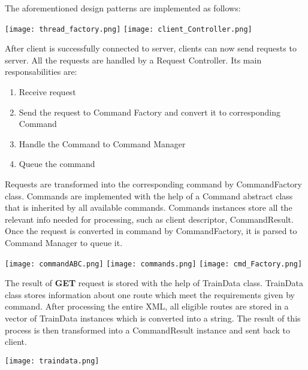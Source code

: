 \documentclass[runningheads]{llncs}
\begin{document}
The aforementioned design patterns are implemented as follows:

\vspace{5mm}

\hspace*{-0.3in}
\texttt{[image: thread\_factory.png]}
\texttt{[image: client\_Controller.png]}

\vspace{5mm}



After client is successfully connected to server, clients can now send requests to server. All the requests are handled by a Request Controller. Its main responsabilities are:


\begin{enumerate}
    \item Receive request
    \item Send the request to Command Factory and convert it to corresponding Command
    \item Handle the Command to Command Manager
    \item Queue the command
\end{enumerate}

Requests are transformed into the corresponding command by CommandFactory class. Commands are implemented with the help of a Command abstract class that is inherited by all available commands. Commands instances store all the relevant info needed for processing, such as client descriptor, CommandResult. Once the request is converted in command by CommandFactory, it is parsed to Command Manager to queue it. 

\vspace{5mm}

\hspace*{-1.3in}
\texttt{[image: commandABC.png]}
\texttt{[image: commands.png]}
\texttt{[image: cmd\_Factory.png]}

The result of \textbf{GET} request is stored with the help of TrainData class. TrainData class stores information about one route which meet the requirements given by command. After processing the entire XML, all eligible routes are stored in a vector of TrainData instances which is converted into a string. The result of this process is then transformed into a CommandResult instance and sent back to client.
\vspace{2mm}

\texttt{[image: traindata.png]}
\end{document}
